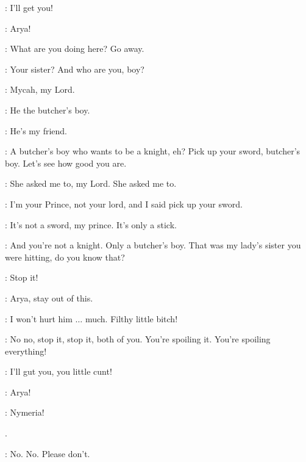 
\MYCAH: I'll get you! 

\SANSA: Arya! 

\ARYA: What are you doing here? Go away. 

\JOFFREY: Your sister? And who are you, boy? 

\MYCAH: Mycah, my Lord. 

\SANSA: He the butcher's boy. 

\ARYA: He's my friend. 

\JOFFREY: A butcher's boy who wants to be a knight, eh? Pick up your sword, butcher's boy. Let's see how good you are. 


\MYCAH: She asked me to, my Lord. She asked me to. 

\JOFFREY: I'm your Prince, not your lord, and I said pick up your sword. 

\MYCAH: It's not a sword, my prince. It's only a stick. 

\JOFFREY: And you're not a knight. Only a butcher's boy. That was my lady's sister you were hitting, do you know that? 

\ARYA: Stop it! 

\SANSA: Arya, stay out of this. 

\JOFFREY: I won't hurt him $\ldots$ much.  Filthy little bitch! 

\SANSA: No no, stop it, stop it, both of you. You're spoiling it. You're spoiling everything! 


\JOFFREY: I'll gut you, you little cunt! 

\SANSA: Arya!


\ARYA: Nymeria! 

.

\JOFFREY: No. No. Please don't. 

